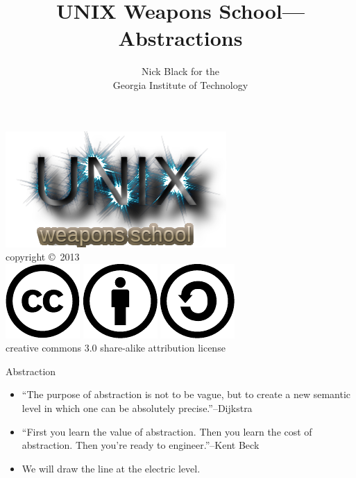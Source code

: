 \documentclass[xcolor={dvipsnames,table}]{beamer}
\title{UNIX Weapons School---Abstractions}
\date{}
\author{Nick Black for the\\
Georgia Institute of Technology
}
\begin{document}
\begin{frame}
\titlepage
\begin{center}
\includegraphics[scale=0.33]{images/uws.png}\\
\vspace{.1in}
\tiny{copyright \copyright\ 2013}\\
\includegraphics[scale=.25]{images/cc-logo.pdf}
\includegraphics[scale=.25]{images/cc-new.pdf}
\includegraphics[scale=.25]{images/cc-share.pdf}\\
\tiny{creative commons 3.0 share-alike attribution license}
\end{center}
\end{frame}

\begin{frame}{Abstraction}
\begin{itemize}
\item ``The purpose of abstraction is not to be vague, but to create a new semantic level in which one can be absolutely precise.''--Dijkstra
\item ``First you learn the value of abstraction. Then you learn the cost of abstraction. Then you're ready to engineer.''--Kent Beck
\item We will draw the line at the electric level.
\end{itemize}
\end{frame}
\end{document}
